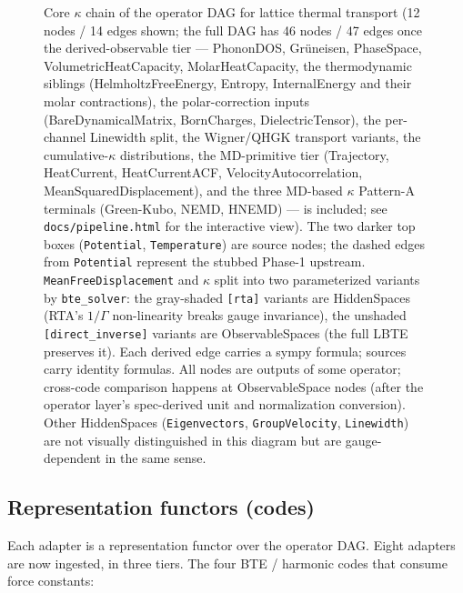 \documentclass[11pt,a4paper]{article}
\begin{document}
\begin{figure}[t]
{\begin{tikzpicture}
\end{tikzpicture}%
}
\caption{Core $\kappa$ chain of the operator DAG for lattice thermal transport
(12 nodes / 14 edges shown; the full DAG has 46 nodes / 47 edges once the
derived-observable tier --- PhononDOS, Grüneisen, PhaseSpace, VolumetricHeatCapacity,
MolarHeatCapacity, the thermodynamic siblings (HelmholtzFreeEnergy, Entropy,
InternalEnergy and their molar contractions), the polar-correction inputs
(BareDynamicalMatrix, BornCharges, DielectricTensor), the per-channel
Linewidth split, the Wigner/QHGK transport variants, the cumulative-$\kappa$
distributions, the MD-primitive tier (Trajectory, HeatCurrent, HeatCurrentACF,
VelocityAutocorrelation, MeanSquaredDisplacement), and the three MD-based
$\kappa$ Pattern-A terminals (Green-Kubo, NEMD, HNEMD) --- is included; see
\texttt{docs/pipeline.html} for the interactive view). The
two darker top boxes (\texttt{Potential}, \texttt{Temperature}) are source nodes;
the dashed edges from \texttt{Potential} represent the stubbed Phase-1 upstream.
\texttt{MeanFreeDisplacement} and $\kappa$ split into two parameterized variants by
\texttt{bte\_solver}: the gray-shaded \texttt{[rta]} variants are HiddenSpaces
(RTA's $1/\Gamma$ non-linearity breaks gauge invariance), the unshaded
\texttt{[direct\_inverse]} variants are ObservableSpaces (the full LBTE preserves it).
Each derived edge carries a sympy formula; sources carry identity formulas. All
nodes are outputs of some operator; cross-code comparison happens at ObservableSpace
nodes (after the operator layer's spec-derived unit and normalization conversion). Other
HiddenSpaces (\texttt{Eigenvectors}, \texttt{GroupVelocity}, \texttt{Linewidth})
are not visually distinguished in this diagram but are gauge-dependent in the same
sense.}
\label{fig:dag}
\end{figure}

\subsection{Representation functors (codes)}

Each adapter is a representation functor over the operator DAG. Eight adapters
are now ingested, in three tiers. The four BTE / harmonic codes that consume
force constants:
\end{document}
